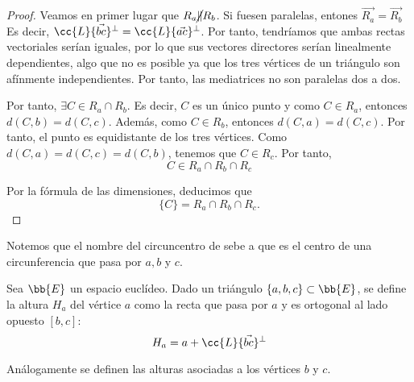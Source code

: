 \begin{proof}
    Veamos en primer lugar que $R_a \cancel{\|} R_b$. Si fuesen paralelas, entones $\vec{R_a}=\vec{R_b}$ Es decir, ${\cc{L}\{\vec{bc}\}^\perp} = {\cc{L}\{\vec{ac}\}^\perp}$. Por tanto, tendríamos que ambas rectas vectoriales serían iguales, por lo que sus vectores directores serían linealmente dependientes, algo que no es posible ya que los tres vértices de un triángulo son afínmente independientes. Por tanto, las mediatrices no son paralelas dos a dos.

    Por tanto, $\exists C\in R_a\cap R_b$. Es decir, $C$ es un único punto y como $C\in R_a$, entonces $d(C,b)=d(C,c)$. Además, como $C\in R_b$, entonces $d(C,a)=d(C,c)$. Por tanto, el punto es equidistante de los tres vértices. Como $d(C,a)=d(C,c)=d(C,b)$, tenemos que $C\in R_c$. Por tanto,
    \begin{equation*}
        C\in R_a\cap R_b\cap R_c
    \end{equation*}

    Por la fórmula de las dimensiones, deducimos que $$\{C\}=R_a\cap R_b\cap R_c.$$
\end{proof}
Notemos que el nombre del circuncentro de sebe a que es el centro de una circunferencia que pasa por $a,b$ y $c$.


\begin{definicion}[Altura]
    Sea $\bb{E}$ un espacio euclídeo. Dado un triángulo $\{a,b,c\}\subset \bb{E}$, se define la altura $H_a$ del vértice $a$ como la recta que pasa por $a$ y es ortogonal al lado opuesto $[b,c]$:
    \begin{equation*}
        H_a = a + \cc{L}\{\vec{bc}\}^\perp
    \end{equation*}

    Análogamente se definen las alturas asociadas a los vértices $b$ y $c$.
\end{definicion}

